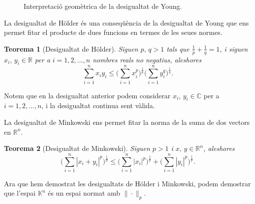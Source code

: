 \documentclass[12pt]{book}
\newtheorem{teorema}{Teorema}[chapter]
\theoremstyle{definition}
\theoremstyle{nota}
\theoremstyle{exemple}
\begin{document}
\begin{figure}[htbp]
  \centering
  \caption{Interpretació geomètrica de la desigualtat de Young.}
\end{figure}

La desigualtat de Hölder és una conseqüència de la desigualtat de
Young que ens permet fitar el producte de dues funcions en termes de
les seues normes.

\begin{teorema}[Desigualtat de Hölder]
  Siguen $p,\, q > 1$ tals que $\frac{1}{p} + \frac{1}{q} = 1$, i
  siguen $x_i,\, y_i \in \mathbb{R}$ per a $i = 1, 2, \dotsc, n$
  nombres reals no negatius, aleshores
  \[
    \sum_{i=1}^{n} x_i y_i \leq
    \Big( \sum_{i=1}^{n} x_i^p \Big)^{\frac{1}{p}}
    \Big( \sum_{i=1}^{n} y_i^q \Big)^{\frac{1}{q}}.
  \]
\end{teorema}

Notem que en la desigualtat anterior podem considerar
$x_i, \, y_i \in \mathbb{C}$ per a $i = 1, 2, \dotsc, n$, i la
desigualtat continua sent vàlida.

La desigualtat de Minkowski ens permet fitar la norma de la suma de
dos vectors en $\mathbb{R}^n$.

\begin{teorema}[Desigualtat de Minkowski]
  Siguen $p > 1$ i $x,\, y \in \mathbb{R}^n$, aleshores
  \[
    \Big( \sum_{i=1}^{n} |x_i + y_i|^p \Big)^{\frac{1}{p}} \leq
    \Big( \sum_{i=1}^{n} |x_i|^p \Big)^{\frac{1}{p}} +
    \Big( \sum_{i=1}^{n} |y_i|^p \Big)^{\frac{1}{p}}.
  \]
\end{teorema}

Ara que hem demostrat les desigualtats de Hölder i Minkowski, podem
demostrar que l'espai $\mathbb{K}^n$ és un espai normat amb
$\|\cdot\|_p$.
\end{document}
